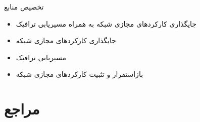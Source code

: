 \documentclass{beamer}
\makeatletter
\newcommand{\RTList}{\raggedleft\rightskip\@totalleftmargin}
\makeatother
\begin{document}
\begin{persian}
  \begin{frame}{تخصیص منابع}
    \begin{itemize}\RTList{}
      \justifying
      \item
            جایگذاری کارکردهای مجازی شبکه به همراه مسیریابی ترافیک\\
            \begin{center}\footnotesize{}\end{center}
      \item
            جایگذاری کارکردهای مجازی شبکه\\
            \begin{center}\footnotesize{}\end{center}
      \item
            مسیریابی ترافیک\\
            \begin{center}\footnotesize{}\end{center}
      \item
            بازاستقرار و تثبیت کارکردهای مجازی شبکه\\
            \begin{center}\footnotesize{}\end{center}
    \end{itemize}
  \end{frame}

  \section{مراجع}

  \begin{frame}{}
    \printbibliography%
  \end{frame}

\end{persian}
\end{document}
